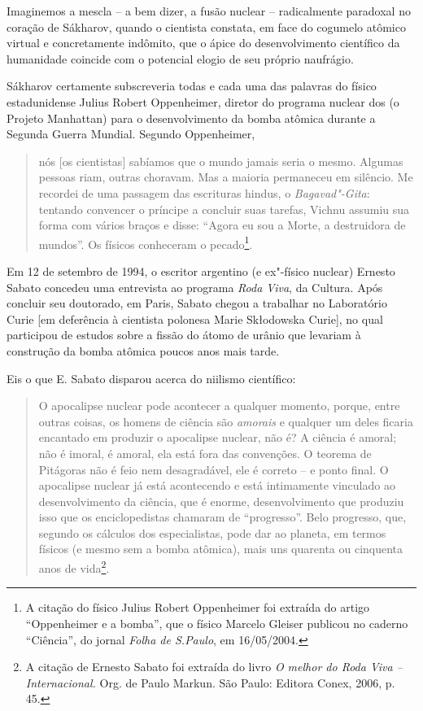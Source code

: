 Imaginemos a mescla -- a bem dizer, a fusão nuclear -- radicalmente
paradoxal no coração de Sákharov, quando o cientista constata, em face
do cogumelo atômico virtual e concretamente indômito, que o ápice do
desenvolvimento científico da humanidade coincide com o potencial elogio
de seu próprio naufrágio.

Sákharov certamente subscreveria todas e cada uma das palavras do físico
estadunidense Julius Robert Oppenheimer, diretor do programa nuclear dos
 (o Projeto Manhattan) para o desenvolvimento da bomba atômica
durante a Segunda Guerra Mundial. Segundo Oppenheimer,

\begin{quote}
nós {[}os cientistas{]} sabíamos que o mundo jamais seria o mesmo.
Algumas pessoas riam, outras choravam. Mas a maioria permaneceu em
silêncio. Me recordei de uma passagem das escrituras hindus, o
\emph{Bagavad"-Gita}: tentando convencer o príncipe a concluir suas
tarefas, Vichnu assumiu sua forma com vários braços e disse: ``Agora eu
sou a Morte, a destruidora de mundos''. Os físicos conheceram o
pecado\footnote{A citação do físico Julius Robert Oppenheimer foi
  extraída do artigo ``Oppenheimer e a bomba'', que o físico Marcelo
  Gleiser publicou no caderno ``Ciência'', do jornal \emph{Folha de
  S.Paulo}, em 16/05/2004.}.
\end{quote}

Em 12 de setembro de 1994, o escritor argentino (e ex"-físico nuclear)
Ernesto Sabato concedeu uma entrevista ao programa \emph{Roda Viva}, da
 Cultura. Após concluir seu doutorado, em Paris, Sabato chegou a
trabalhar no Laboratório Curie {[}em deferência à cientista polonesa
Marie Skłodowska Curie{]}, no qual participou de estudos sobre a fissão
do átomo de urânio que levariam à construção da bomba atômica poucos
anos mais tarde.

Eis o que E. Sabato disparou acerca do niilismo científico:

\begin{quote}
O apocalipse nuclear pode acontecer a qualquer momento, porque, entre
outras coisas, os homens de ciência são \emph{amorais} e qualquer um
deles ficaria encantado em produzir o apocalipse nuclear, não é? A
ciência é amoral; não é imoral, é amoral, ela está fora das convenções.
O teorema de Pitágoras não é feio nem desagradável, ele é correto -- e
ponto final. O apocalipse nuclear já está acontecendo e está intimamente
vinculado ao desenvolvimento da ciência, que é enorme, desenvolvimento
que produziu isso que os enciclopedistas chamaram de ``progresso''. Belo
progresso, que, segundo os cálculos dos especialistas, pode dar ao
planeta, em termos físicos (e mesmo sem a bomba atômica), mais uns
quarenta ou cinquenta anos de vida\footnote{A citação de Ernesto Sabato
  foi extraída do livro \emph{O melhor do Roda Viva -- Internacional.}
  Org. de Paulo Markun. São Paulo: Editora Conex, 2006, p. 45.}.
\end{quote}

